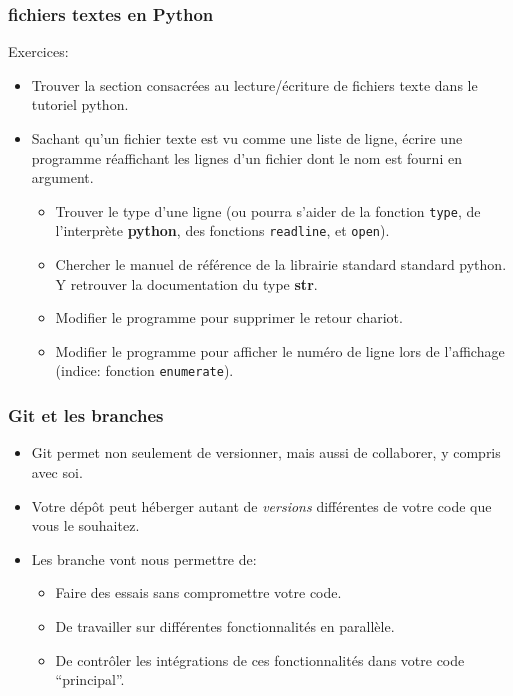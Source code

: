 \documentclass{beamer}
\begin{document}
\begin{frame}[fragile]\frametitle{fichiers textes en Python}
  Exercices:
  \begin{itemize}
  \item Trouver la section consacrées au lecture/écriture de fichiers texte dans le tutoriel python.
  \item Sachant qu'un fichier texte est vu comme une liste de ligne, écrire une programme réaffichant les lignes d'un fichier dont le nom est fourni en argument.
    \begin{itemize}
    \item Trouver le type d'une ligne (ou pourra s'aider de la fonction {\tt type}, de l'interprète {\bf python}, des fonctions {\tt readline}, et {\tt open}).
    \item Chercher le manuel de référence de la librairie standard standard python. Y retrouver la documentation du type {\bf str}.
    \item Modifier le programme pour supprimer le retour chariot.
    \item Modifier le programme pour afficher le numéro de ligne lors de l'affichage (indice: fonction {\tt enumerate}).
    \end{itemize}
  \end{itemize}
\end{frame}

\begin{frame}[fragile]\frametitle{Git et les branches}
  \begin{itemize}
  \item Git permet non seulement de versionner, mais aussi de collaborer, y compris avec soi.
  \item Votre dépôt peut héberger autant de {\em versions} différentes de votre code que vous le souhaitez.
  \item Les branche vont nous permettre de:
    \begin{itemize}
    \item Faire des essais sans compromettre votre code.
    \item De travailler sur différentes fonctionnalités en parallèle.
    \item De contrôler les intégrations de ces fonctionnalités dans votre code {``principal''}.
    \end{itemize}
  \end{itemize}
\end{frame}
\end{document}
